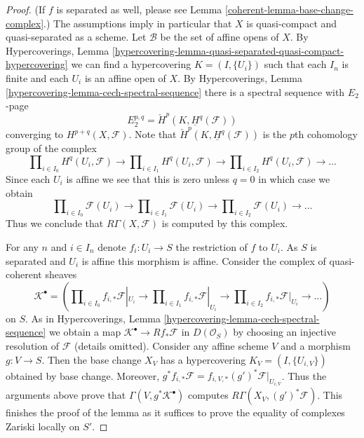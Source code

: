 \begin{proof}

(If $f$ is separated as well, please see
Lemma \ref{coherent-lemma-base-change-complex}.)
The assumptions imply in particular that $X$
is quasi-compact and quasi-separated as a scheme.
Let $\mathcal{B}$ be the set of affine opens of $X$. By
Hypercoverings,
Lemma \ref{hypercovering-lemma-quasi-separated-quasi-compact-hypercovering}
we can find a hypercovering $K = (I, \{U_i\})$ such that each
$I_n$ is finite and each $U_i$ is an affine open of $X$. By
Hypercoverings, Lemma \ref{hypercovering-lemma-cech-spectral-sequence}
there is a spectral sequence with $E_2$-page
$$
E_2^{p, q} = \check{H}^p(K, \underline{H}^q(\mathcal{F}))
$$
converging to $H^{p + q}(X, \mathcal{F})$. Note that
$\check{H}^p(K, \underline{H}^q(\mathcal{F}))$ is the $p$th cohomology
group of the complex
$$
\prod\nolimits_{i \in I_0} H^q(U_i, \mathcal{F})
\to
\prod\nolimits_{i \in I_1} H^q(U_i, \mathcal{F})
\to
\prod\nolimits_{i \in I_2} H^q(U_i, \mathcal{F})
\to \ldots
$$
Since each $U_i$ is affine we see that this is zero unless $q = 0$
in which case we obtain
$$
\prod\nolimits_{i \in I_0} \mathcal{F}(U_i)
\to
\prod\nolimits_{i \in I_1} \mathcal{F}(U_i)
\to
\prod\nolimits_{i \in I_2} \mathcal{F}(U_i)
\to \ldots
$$
Thus we conclude that $R\Gamma(X, \mathcal{F})$ is computed by
this complex.

\medskip\noindent
For any $n$ and $i \in I_n$ denote $f_i : U_i \to S$ the restriction of
$f$ to $U_i$. As $S$ is separated and $U_i$ is affine this morphism
is affine. Consider the complex of quasi-coherent sheaves
$$
\mathcal{K}^\bullet = (
\prod\nolimits_{i \in I_0} f_{i, *}\mathcal{F}|_{U_i}
\to
\prod\nolimits_{i \in I_1} f_{i, *}\mathcal{F}|_{U_i}
\to
\prod\nolimits_{i \in I_2} f_{i, *}\mathcal{F}|_{U_i}
\to \ldots )
$$
on $S$. As in
Hypercoverings, Lemma \ref{hypercovering-lemma-cech-spectral-sequence}
we obtain a map $\mathcal{K}^\bullet \to Rf_*\mathcal{F}$ in
$D(\mathcal{O}_S)$ by choosing an injective resolution of $\mathcal{F}$
(details omitted). Consider any affine scheme $V$ and a morphism
$g : V \to S$. Then the base change $X_V$ has a hypercovering
$K_V = (I, \{U_{i, V}\})$ obtained by base change. Moreover,
$g^*f_{i, *}\mathcal{F} = f_{i, V, *}(g')^*\mathcal{F}|_{U_{i, V}}$.
Thus the arguments above prove that $\Gamma(V, g^*\mathcal{K}^\bullet)$
computes $R\Gamma(X_V, (g')^*\mathcal{F})$.
This finishes the proof of the lemma as it suffices to prove
the equality of complexes Zariski locally on $S'$.
\end{proof}

